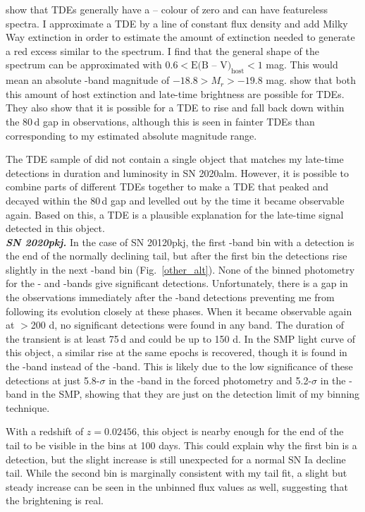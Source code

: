 \documentclass[a4paper,oneside,12pt, class=Latex/Classes/PhDthesisPSnPDF, crop=false]{standalone}
\begin{document}
\citet{TDE_host_ext_range} show that TDEs generally have a \ztfg -- \ztfr colour of zero and can have featureless spectra. I approximate a TDE by a line of constant flux density and add Milky Way extinction \citep[using the SFD89 dust maps in the direction of the object;][]{SFD98_dust_maps} in order to estimate the amount of extinction needed to generate a red excess similar to the spectrum. I find that the general shape of the spectrum can be approximated with $0.6 < \text{E(B -- V)}_\text{host} < 1$ mag. This would mean an absolute \ztfr-band magnitude of $-18.8 > M_r > -19.8$ mag. \citet{TDE_host_ext_range} show that both this amount of host extinction and late-time brightness are possible for TDEs. They also show that it is possible for a TDE to rise and fall back down within the 80\,d gap in observations, although this is seen in fainter TDEs than corresponding to my estimated absolute magnitude range.

The TDE sample of \citet{TDE_host_ext_range} did not contain a single object that matches my late-time detections in duration and luminosity in SN 2020alm. However, it is possible to combine parts of different TDEs together to make a TDE that peaked and decayed within the 80\,d gap and levelled out by the time it became observable again. Based on this, a TDE is a plausible explanation for the late-time signal detected in this object.\\


\textit{\textbf{SN 2020pkj.}}
In the case of SN 20120pkj, the first \ztfr-band bin with a detection is the end of the normally declining tail, but after the first bin the detections rise slightly in the next \ztfr-band bin (Fig.~\ref{other_alt}). None of the binned photometry for the \ztfg- and \ztfi-bands give significant detections. Unfortunately, there is a gap in the observations immediately after the \ztfr-band detections preventing me from following its evolution closely at these phases. When it became observable again at $>$200 d, no significant detections were found in any band. The duration of the transient is at least 75\,d and could be up to 150 d. In the SMP light curve of this object, a similar rise at the same epochs is recovered, though it is found in the \ztfg-band instead of the \ztfr-band. This is likely due to the low significance of these detections at just 5.8-$\sigma$ in the \ztfr-band in the forced photometry and 5.2-$\sigma$ in the \ztfg-band in the SMP, showing that they are just on the detection limit of my binning technique.

With a redshift of $z = 0.02456$, this object is nearby enough for the end of the tail to be visible in the bins at 100 days. This could explain why the first bin is a detection, but the slight increase is still unexpected for a normal SN Ia decline tail. While the second bin is marginally consistent with my tail fit, a slight but steady increase can be seen in the unbinned flux values as well, suggesting that the brightening is real.
\end{document}
